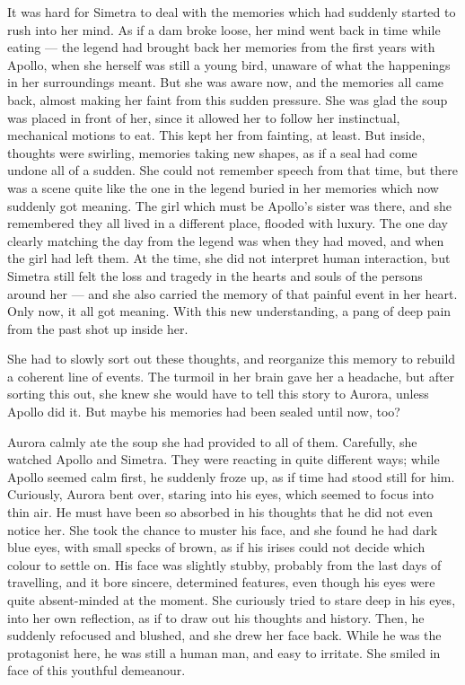 \fancybreaker{}

It was hard for Simetra to deal with the memories which had suddenly started to rush into her mind. As if a dam broke loose, her mind went back in time while eating --- the legend had brought back her memories from the first years with Apollo, when she herself was still a young bird, unaware of what the happenings in her surroundings meant. But she was aware now, and the memories all came back, almost making her faint from this sudden pressure. She was glad the soup was placed in front of her, since it allowed her to follow her instinctual, mechanical motions to eat. This kept her from fainting, at least. But inside, thoughts were swirling, memories taking new shapes, as if a seal had come undone all of a sudden. She could not remember speech from that time, but there was a scene quite like the one in the legend buried in her memories which now suddenly got meaning. The girl which must be Apollo's sister was there, and she remembered they all lived in a different place, flooded with luxury. The one day clearly matching the day from the legend was when they had moved, and when the girl had left them. At the time, she did not interpret human interaction, but Simetra still felt the loss and tragedy in the hearts and souls of the persons around her --- and she also carried the memory of that painful event in her heart. Only now, it all got meaning. With this new understanding, a pang of deep pain from the past shot up inside her.

She had to slowly sort out these thoughts, and reorganize this memory to rebuild a coherent line of events. The turmoil in her brain gave her a headache, but after sorting this out, she knew she would have to tell this story to Aurora, unless Apollo did it. But maybe his memories had been sealed until now, too?

\fancybreaker{}

Aurora calmly ate the soup she had provided to all of them. Carefully, she watched Apollo and Simetra. They were reacting in quite different ways; while Apollo seemed calm first, he suddenly froze up, as if time had stood still for him. Curiously, Aurora bent over, staring into his eyes, which seemed to focus into thin air. He must have been so absorbed in his thoughts that he did not even notice her. She took the chance to muster his face, and she found he had dark blue eyes, with small specks of brown, as if his irises could not decide which colour to settle on. His face was slightly stubby, probably from the last days of travelling, and it bore sincere, determined features, even though his eyes were quite absent-minded at the moment. She curiously tried to stare deep in his eyes, into her own reflection, as if to draw out his thoughts and history. Then, he suddenly refocused and blushed, and she drew her face back. While he was the protagonist here, he was still a human man, and easy to irritate. She smiled in face of this youthful demeanour. 

